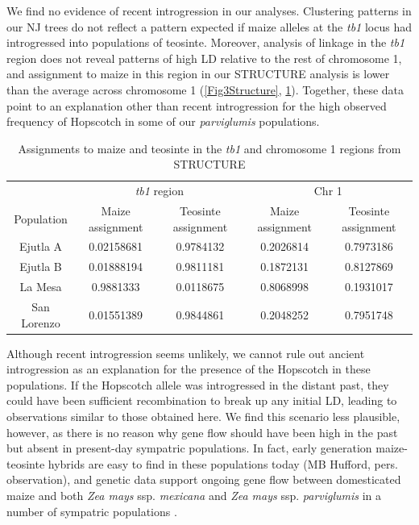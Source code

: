 \documentclass[12pt]{article}
\begin{document}
We find no evidence of recent introgression in our analyses. Clustering patterns in our NJ trees do not reflect a pattern expected if maize alleles at the \emph{tb1} locus had introgressed into populations of teosinte.  Moreover, analysis of linkage in the \emph{tb1} region does not reveal patterns of high LD relative to the rest of chromosome 1, and assignment to maize in this region in our STRUCTURE analysis is lower than the average across chromosome 1 (\ref{Fig3Structure}, \ref{Table4Q}). Together, these data point to an explanation other than recent introgression for the high observed frequency of Hopscotch in some of  our \emph{parviglumis} populations.

\begin{table}[htbp]
  \centering
  \caption{Assignments to maize and teosinte in the \emph{tb1} and chromosome 1 regions from STRUCTURE}
    \begin{tabular}{ccccc}
          & \multicolumn{2}{c}{\emph{tb1} region} & \multicolumn{2}{c}{Chr 1} \\
    Population & Maize assignment & Teosinte assignment & Maize assignment & Teosinte assignment \\
    Ejutla A & 0.02158681 & 0.9784132 & 0.2026814 & 0.7973186 \\
    Ejutla B & 0.01888194 & 0.9811181 & 0.1872131 & 0.8127869 \\
    La Mesa & 0.9881333 & 0.0118675 & 0.8068998 & 0.1931017 \\
    San Lorenzo & 0.01551389 & 0.9844861 & 0.2048252 & 0.7951748 \\
    \end{tabular}
  \label{Table4Q}
\end{table}

Although recent introgression seems unlikely, we cannot rule out ancient introgression as an explanation for the presence of the Hopscotch in these populations. If the Hopscotch allele was introgressed in the distant past, they could have been sufficient recombination to break up any initial LD, leading to observations similar to those obtained here.  We find this scenario less plausible, however, as there is no reason why gene flow should have been high in the past but absent in present-day sympatric populations.  In fact, early generation maize-teosinte hybrids are easy to find in these populations today (MB Hufford, pers. observation), and genetic data support ongoing gene flow between domesticated maize and both \emph{Zea mays} ssp. \emph{mexicana} and \emph{Zea mays} ssp. \emph{parviglumis} in a number of sympatric populations \citep{Hufford2013, Ellstrand2007, vanHeerwaarden2011}. 
\end{document}

